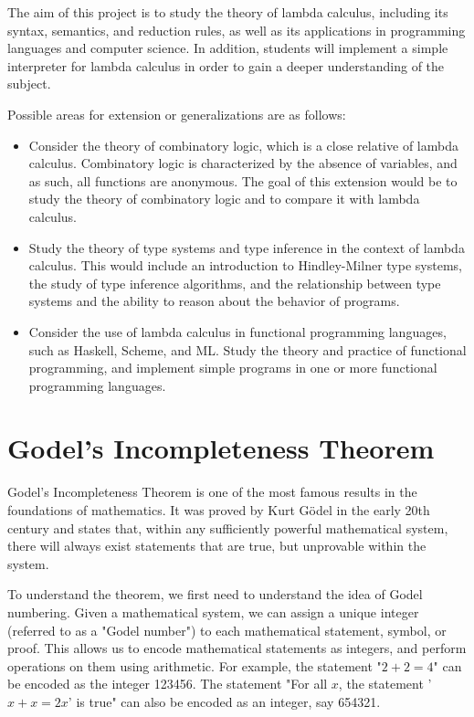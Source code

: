 \documentclass{article}
\begin{document}
\vspace{3mm}
The aim of this project is to study the theory of lambda calculus, including its syntax, semantics, and reduction rules, as well as its applications in programming languages and computer science. In addition, students will implement a simple interpreter for lambda calculus in order to gain a deeper understanding of the subject.

\vspace{3mm}
Possible areas for extension or generalizations are as follows:
\begin{itemize}
\item Consider the theory of combinatory logic, which is a close relative of lambda calculus. Combinatory logic is characterized by the absence of variables, and as such, all functions are anonymous. The goal of this extension would be to study the theory of combinatory logic and to compare it with lambda calculus.
\item Study the theory of type systems and type inference in the context of lambda calculus. This would include an introduction to Hindley-Milner type systems, the study of type inference algorithms, and the relationship between type systems and the ability to reason about the behavior of programs.
\item Consider the use of lambda calculus in functional programming languages, such as Haskell, Scheme, and ML. Study the theory and practice of functional programming, and implement simple programs in one or more functional programming languages.
\end{itemize}

\pagebreak 

\section{Godel's Incompleteness Theorem}

Godel's Incompleteness Theorem is one of the most famous results in the foundations of mathematics. It was proved by Kurt Gödel in the early 20th century and states that, within any sufficiently powerful mathematical system, there will always exist statements that are true, but unprovable within the system.

\vspace{3mm}
To understand the theorem, we first need to understand the idea of Godel numbering. Given a mathematical system, we can assign a unique integer (referred to as a "Godel number") to each mathematical statement, symbol, or proof. This allows us to encode mathematical statements as integers, and perform operations on them using arithmetic. For example, the statement "$2 + 2 = 4$" can be encoded as the integer 123456. The statement "For all $x$, the statement '$x + x = 2x$' is true" can also be encoded as an integer, say 654321.
\end{document}
